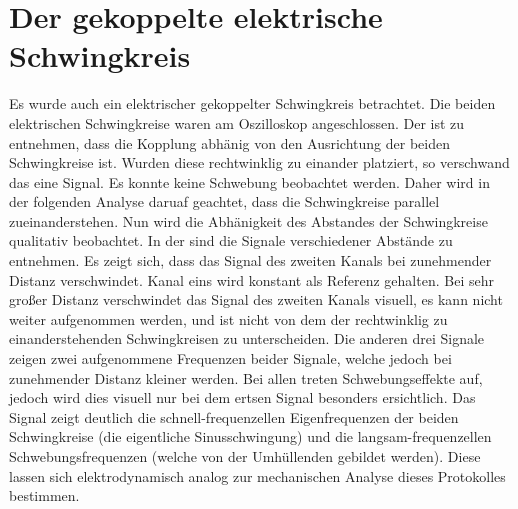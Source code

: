 \section{Der gekoppelte elektrische Schwingkreis}
\label{sec:A4}
Es wurde auch ein elektrischer gekoppelter Schwingkreis betrachtet. Die beiden elektrischen Schwingkreise waren am Oszilloskop angeschlossen. Der  ist zu entnehmen, dass die Kopplung abhänig von den Ausrichtung der beiden Schwingkreise ist. Wurden diese rechtwinklig zu einander platziert, so verschwand das eine Signal. Es konnte keine Schwebung beobachtet werden.
Daher wird in der folgenden Analyse daruaf geachtet, dass die Schwingkreise parallel zueinanderstehen.
Nun wird die Abhänigkeit des Abstandes der Schwingkreise qualitativ beobachtet. In der  sind die Signale verschiedener Abstände zu entnehmen.
Es zeigt sich, dass das Signal des zweiten Kanals bei zunehmender Distanz verschwindet. Kanal eins wird konstant als Referenz gehalten. Bei sehr großer Distanz verschwindet das Signal des zweiten Kanals visuell, es kann nicht weiter aufgenommen werden, und ist nicht von dem der rechtwinklig zu einanderstehenden Schwingkreisen zu unterscheiden. 
Die anderen drei Signale zeigen zwei aufgenommene Frequenzen beider Signale, welche jedoch bei zunehmender Distanz kleiner werden. 
Bei allen treten Schwebungseffekte auf, jedoch wird dies visuell nur bei dem ertsen Signal besonders ersichtlich. Das Signal zeigt deutlich die schnell-frequenzellen Eigenfrequenzen der beiden Schwingkreise (die eigentliche Sinusschwingung) und die langsam-frequenzellen Schwebungsfrequenzen (welche von der Umhüllenden gebildet werden).
Diese lassen sich elektrodynamisch analog zur mechanischen Analyse dieses Protokolles bestimmen.

